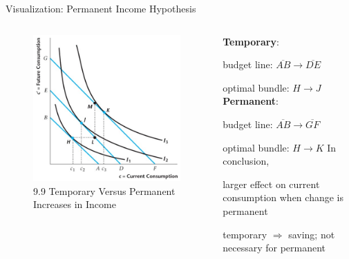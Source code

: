 \documentclass[11pt,aspectratio=169,usenames,dvipsnames]{beamer}
\let\tempone\itemize
\let\temptwo\enditemize
\renewenvironment{itemize}{\tempone\addtolength{\itemsep}{\fill}}{\temptwo}
\begin{document}
\begin{frame}{Visualization: Permanent Income Hypothesis}
\label{slide:Visualization__Permanent_Income_Hypothesis}
    \begin{columns}
        \begin{column}{0.5\textwidth}
            \begin{figure}
                \caption{\scriptsize 9.9  Temporary Versus Permanent Increases in Income}
                \includegraphics[width=.8\textwidth]{./figures/Figure9_9.jpg}
            \end{figure}
        \end{column}
        \begin{column}{0.5\textwidth}
            \textbf{Temporary}:
            \begin{itemize}
                \item budget line: $ \overline{AB} \rightarrow \overline{DE} $
                \item optimal bundle: $ H \rightarrow J $
            \end{itemize}
            \textbf{Permanent}:
            \begin{itemize}
                \item budget line: $ \overline{AB} \rightarrow \overline{GF} $
                \item optimal bundle: $ H \rightarrow K $
            \end{itemize}
            In conclusion,
            \begin{itemize}
                \item larger effect on current consumption when change is permanent
                \item temporary $ \Rightarrow  $ saving; not necessary for permanent
            \end{itemize}
        \end{column}
    \end{columns}
\end{frame}
\end{document}
